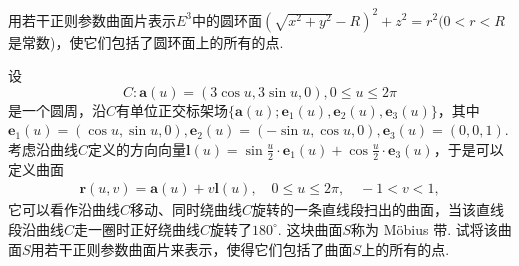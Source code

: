 \documentclass[../../main.tex]{subfiles}%
\begin{document}
\begin{example}
用若干正则参数曲面片表示$E^3$中的圆环面$(\sqrt{x^2 + y^2} - R)^2 + z^2 = r^2(0 < r < R$是常数)，使它们包括了圆环面上的所有的点.
\end{example}
\begin{solution}



\end{solution}

\begin{example}
设
$$
C: \bm{a}(u) = (3\cos u, 3\sin u, 0), 0 \leqslant u \leqslant 2\pi
$$
是一个圆周，沿$C$有单位正交标架场$\{\bm{a}(u); \bm{e}_1(u), \bm{e}_2(u), \bm{e}_3(u)\}$，其中$\bm{e}_1(u) = (\cos u, \sin u, 0), \bm{e}_2(u) = (-\sin u, \cos u, 0), \bm{e}_3(u) = (0,0,1)$. 考虑沿曲线$C$定义的方向向量$\bm{l}(u) = \sin \frac{u}{2} \cdot \bm{e}_1(u) + \cos \frac{u}{2} \cdot \bm{e}_3(u)$，于是可以定义曲面
\begin{align*}
\bm{r}(u,v) = \bm{a}(u) + v\bm{l}(u), \quad 0 \leqslant u \leqslant 2\pi, \quad -1 < v < 1,
\end{align*}
它可以看作沿曲线$C$移动、同时绕曲线$C$旋转的一条直线段扫出的曲面，当该直线段沿曲线$C$走一圈时正好绕曲线$C$旋转了$180^\circ$. 这块曲面$S$称为 Möbius 带. 试将该曲面$S$用若干正则参数曲面片来表示，使得它们包括了曲面$S$上的所有的点.
\end{example}
\begin{solution}



\end{solution}
\end{document}
